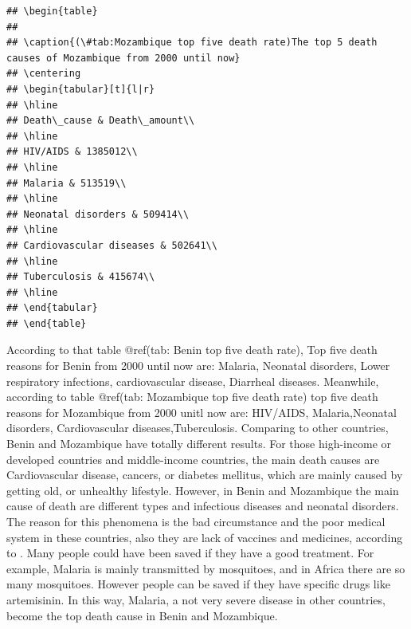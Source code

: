 \documentclass[11pt,a4paper,]{article}
\begin{document}
\begin{verbatim}
## \begin{table}
## 
## \caption{(\#tab:Mozambique top five death rate)The top 5 death causes of Mozambique from 2000 until now}
## \centering
## \begin{tabular}[t]{l|r}
## \hline
## Death\_cause & Death\_amount\\
## \hline
## HIV/AIDS & 1385012\\
## \hline
## Malaria & 513519\\
## \hline
## Neonatal disorders & 509414\\
## \hline
## Cardiovascular diseases & 502641\\
## \hline
## Tuberculosis & 415674\\
## \hline
## \end{tabular}
## \end{table}
\end{verbatim}

According to that table @ref(tab: Benin top five death rate), Top five death reasons for Benin from 2000 until now are: Malaria, Neonatal disorders, Lower respiratory infections, cardiovascular disease, Diarrheal diseases.
Meanwhile, according to table @ref(tab: Mozambique top five death rate) top five death reasons for Mozambique from 2000 unitl now are: HIV/AIDS, Malaria,Neonatal disorders, Cardiovascular diseases,Tuberculosis.
Comparing to other countries, Benin and Mozambique have totally different results. For those high-income or developed countries and middle-income countries, the main death causes are Cardiovascular disease, cancers, or diabetes mellitus, which are mainly caused by getting old, or unhealthy lifestyle. However, in Benin and Mozambique the main cause of death are different types and infectious diseases and neonatal disorders. The reason for this phenomena is the bad circumstance and the poor medical system in these countries, also they are lack of vaccines and medicines, according to \textcite{mbaye2019telling}. Many people could have been saved if they have a good treatment. For example, Malaria is mainly transmitted by mosquitoes, and in Africa there are so many mosquitoes. However people can be saved if they have specific drugs like artemisinin. In this way, Malaria, a not very severe disease in other countries, become the top death cause in Benin and Mozambique.
\end{document}
